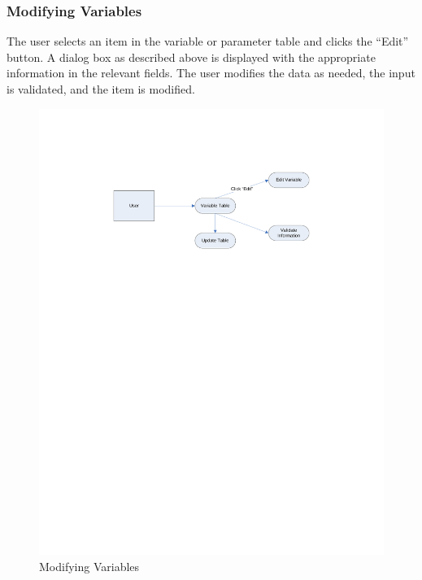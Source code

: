 \documentclass{article}
\begin{document}
\subsubsection{Modifying Variables}
The user selects an item in the variable or parameter table and clicks the ``Edit'' button. A dialog box as described above is displayed with the appropriate information in the relevant fields. The user modifies the data as needed, the input is validated, and the item is modified.
\begin{figure}[!htb]
\centering
\includegraphics[width=\textwidth]{./diagrams/edit-var}
\caption{Modifying Variables}
\end{figure}
\end{document}
